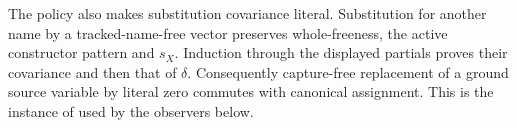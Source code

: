 The policy also makes substitution covariance literal. Substitution for
another name by a tracked-name-free vector preserves whole-freeness,
the active constructor pattern and $s_X$. Induction through the displayed
partials proves their covariance and then that of $\delta$.
Consequently capture-free replacement of a ground source variable by
literal zero commutes with canonical assignment. This is the instance
of \cite[Lemma~2.20]{ww} used by the observers below.
